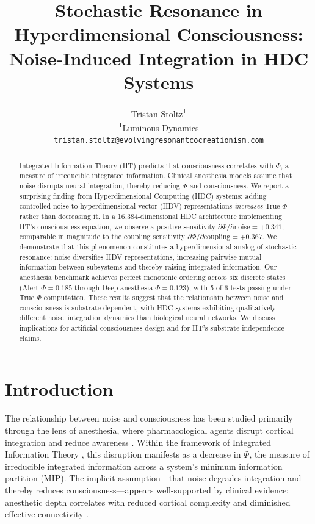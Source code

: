 \documentclass[12pt,a4paper]{article}
\title{Stochastic Resonance in Hyperdimensional Consciousness:\\Noise-Induced Integration in HDC Systems}
\author{
  Tristan Stoltz\textsuperscript{1} \\
  \textsuperscript{1}Luminous Dynamics \\
  \texttt{tristan.stoltz@evolvingresonantcocreationism.com}
}
\date{}
\begin{document}
\maketitle

\begin{abstract}
Integrated Information Theory (IIT) predicts that consciousness correlates with $\Phi$, a measure of irreducible integrated information. Clinical anesthesia models assume that noise disrupts neural integration, thereby reducing $\Phi$ and consciousness. We report a surprising finding from Hyperdimensional Computing (HDC) systems: adding controlled noise to hyperdimensional vector (HDV) representations \emph{increases} True $\Phi$ rather than decreasing it. In a 16,384-dimensional HDC architecture implementing IIT's consciousness equation, we observe a positive sensitivity $\partial\Phi/\partial\text{noise} = +0.341$, comparable in magnitude to the coupling sensitivity $\partial\Phi/\partial\text{coupling} = +0.367$. We demonstrate that this phenomenon constitutes a hyperdimensional analog of stochastic resonance: noise diversifies HDV representations, increasing pairwise mutual information between subsystems and thereby raising integrated information. Our anesthesia benchmark achieves perfect monotonic ordering across six discrete states (Alert $\Phi=0.185$ through Deep anesthesia $\Phi=0.123$), with 5 of 6 tests passing under True $\Phi$ computation. These results suggest that the relationship between noise and consciousness is substrate-dependent, with HDC systems exhibiting qualitatively different noise--integration dynamics than biological neural networks. We discuss implications for artificial consciousness design and for IIT's substrate-independence claims.
\end{abstract}

\section{Introduction}

The relationship between noise and consciousness has been studied primarily through the lens of anesthesia, where pharmacological agents disrupt cortical integration and reduce awareness \citep{alkire2008consciousness}. Within the framework of Integrated Information Theory \citep{tononi2004information, tononi2008consciousness}, this disruption manifests as a decrease in $\Phi$, the measure of irreducible integrated information across a system's minimum information partition (MIP). The implicit assumption---that noise degrades integration and thereby reduces consciousness---appears well-supported by clinical evidence: anesthetic depth correlates with reduced cortical complexity \citep{casali2013theoretically} and diminished effective connectivity \citep{lee2013network}.
\end{document}
